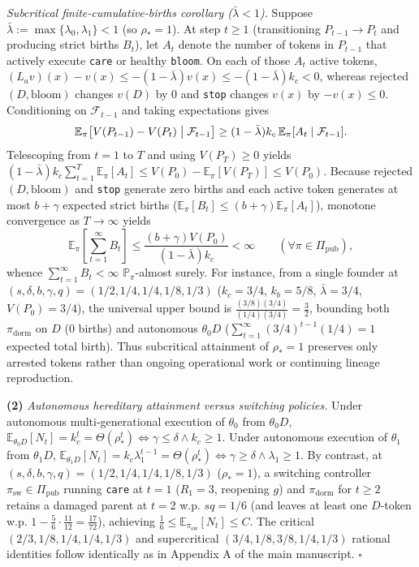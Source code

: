 \documentclass[11pt,letterpaper]{article}
\begin{document}
\emph{Subcritical finite-cumulative-births corollary
(\(\bar{\lambda} < 1\)).} Suppose
\(\bar{\lambda} := \max\{\lambda_0, \lambda_1\} < 1\) (so
\(\rho_* = 1\)). At step \(t \ge 1\) (transitioning \(P_{t-1} \to P_t\)
and producing strict births \(B_t\)), let \(A_t\) denote the number of
tokens in \(P_{t-1}\) that actively execute \texttt{care} or healthy
\texttt{bloom}. On each of those \(A_t\) active tokens,
\((L_a v)(x) - v(x) \le -(1 - \bar{\lambda})v(x) \le -(1 - \bar{\lambda})k_c < 0\),
whereas rejected \((D,\mathrm{bloom})\) changes \(v(D)\) by \(0\) and
\texttt{stop} changes \(v(x)\) by \(-v(x) \le 0\). Conditioning on
\(\mathcal{F}_{t-1}\) and taking expectations gives
\[\mathbb{E}_\pi\bigl[V(P_{t-1}) - V(P_t)\bigm|\mathcal{F}_{t-1}\bigr] \ge (1 - \bar{\lambda}) k_c\,\mathbb{E}_\pi[A_t \mid \mathcal{F}_{t-1}].\]
Telescoping from \(t=1\) to \(T\) and using \(V(P_T) \ge 0\) yields
\((1 - \bar{\lambda})k_c \sum_{t=1}^T \mathbb{E}_\pi[A_t] \le V(P_0) - \mathbb{E}_\pi[V(P_T)] \le V(P_0)\).
Because rejected \((D,\mathrm{bloom})\) and \texttt{stop} generate zero
births and each active token generates at most \(b + \gamma\) expected
strict births
(\(\mathbb{E}_\pi[B_t] \le (b+\gamma)\mathbb{E}_\pi[A_t]\)), monotone
convergence as \(T \to \infty\) yields
\[\mathbb{E}_\pi\!\left[\sum_{t=1}^\infty B_t\right] \le \frac{(b + \gamma) V(P_0)}{(1 - \bar{\lambda}) k_c} < \infty
\qquad (\forall \pi \in \Pi_{\mathrm{pub}}),\] whence
\(\sum_{t=1}^\infty B_t < \infty\) \(\mathbb{P}_\pi\)-almost surely. For
instance, from a single founder at
\((s,\delta,b,\gamma,q) = (1/2, 1/4, 1/4, 1/8, 1/3)\) (\(k_c = 3/4\),
\(k_b = 5/8\), \(\bar{\lambda} = 3/4\), \(V(P_0) = 3/4\)), the universal
upper bound is \(\frac{(3/8)(3/4)}{(1/4)(3/4)} = \frac{3}{2}\), bounding
both \(\pi_{\mathrm{dorm}}\) on \(D\) (\(0\) births) and autonomous
\(\theta_0 D\) (\(\sum_{t=1}^\infty (3/4)^{t-1}(1/4) = 1\) expected
total birth). Thus subcritical attainment of \(\rho_* = 1\) preserves
only arrested tokens rather than ongoing operational work or continuing
lineage reproduction.

\textbf{(2)} \emph{Autonomous hereditary attainment versus switching
policies.} Under autonomous multi-generational execution of \(\theta_0\)
from \(\theta_0 D\),
\(\mathbb{E}_{\theta_0 D}[N_t] = k_c^t = \Theta(\rho_*^t) \iff \gamma \le \delta \land k_c \ge 1\).
Under autonomous execution of \(\theta_1\) from \(\theta_1 D\),
\(\mathbb{E}_{\theta_1 D}[N_t] = k_c \lambda_1^{t-1} = \Theta(\rho_*^t) \iff \gamma \ge \delta \land \lambda_1 \ge 1\).
By contrast, at \((s,\delta,b,\gamma,q) = (1/2, 1/4, 1/4, 1/8, 1/3)\)
(\(\rho_* = 1\)), a switching controller
\(\pi_{\mathrm{sw}} \in \Pi_{\mathrm{pub}}\) running \texttt{care} at
\(t=1\) (\(R_1 = 3\), reopening \(g\)) and \(\pi_{\mathrm{dorm}}\) for
\(t \ge 2\) retains a damaged parent at \(t=2\) w.p. \(sq = 1/6\) (and
leaves at least one \(D\)-token w.p.
\(1 - \frac{5}{6}\cdot\frac{11}{12} = \frac{17}{72}\)), achieving
\(\frac{1}{6} \le \mathbb{E}_{\pi_{\mathrm{sw}}}[N_t] \le C\). The
critical \((2/3,1/8,1/4,1/4,1/3)\) and supercritical
\((3/4,1/8,3/8,1/4,1/3)\) rational identities follow identically as in
Appendix A of the main manuscript. \(\square\)
\end{document}
